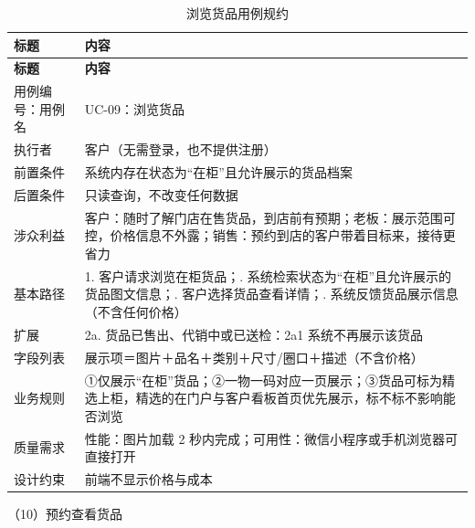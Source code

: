 {\small
\begin{longtable}{@{}L{3.0cm} L{12.3cm}@{}}
\caption{浏览货品用例规约}\label{tab:uc-09}\\
\toprule
\textbf{标题} & \textbf{内容} \\
\midrule
\endfirsthead
\toprule
\textbf{标题} & \textbf{内容} \\
\midrule
\endhead
用例编号：用例名 & UC-09：浏览货品 \\
\midrule
执行者 & 客户（无需登录，也不提供注册） \\
\midrule
前置条件 & 系统内存在状态为“在柜”且允许展示的货品档案 \\
\midrule
后置条件 & 只读查询，不改变任何数据 \\
\midrule
涉众利益 & 客户：随时了解门店在售货品，到店前有预期；\newline 老板：展示范围可控，价格信息不外露；\newline 销售：预约到店的客户带着目标来，接待更省力 \\
\midrule
基本路径 & 1. 客户请求浏览在柜货品；. 系统检索状态为“在柜”且允许展示的货品图文信息；. 客户选择货品查看详情；. 系统反馈货品展示信息（不含任何价格） \\
\midrule
扩展 & 2a. 货品已售出、代销中或已送检：2a1 系统不再展示该货品 \\
\midrule
字段列表 & 展示项＝图片＋品名＋类别＋尺寸/圈口＋描述（不含价格） \\
\midrule
业务规则 & ①仅展示“在柜”货品；\newline ②一物一码对应一页展示；\newline ③货品可标为精选上柜，精选的在门户与客户看板首页优先展示，标不标不影响能否浏览 \\
\midrule
质量需求 & 性能：图片加载 2 秒内完成；\newline 可用性：微信小程序或手机浏览器可直接打开 \\
\midrule
设计约束 & 前端不显示价格与成本 \\
\midrule
\bottomrule
\end{longtable}}
\noindent（10）预约查看货品


